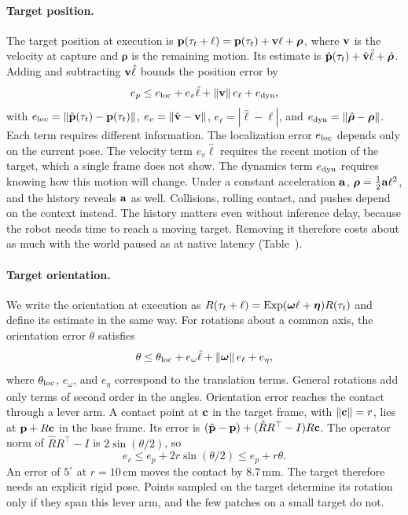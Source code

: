 \paragraph{Target position.}
The target position at execution is $\mathbf{p}(\tau_t+\ell)=\mathbf{p}(\tau_t)+\mathbf{v}\ell
+\boldsymbol\rho$, where $\mathbf{v}$ is the velocity at capture and $\boldsymbol\rho$ is
the remaining motion. Its estimate is $\hat{\mathbf{p}}(\tau_t)+\hat{\mathbf{v}}\hat\ell
+\hat{\boldsymbol\rho}$. Adding and subtracting $\mathbf{v}\hat\ell$ bounds the position
error by
\begin{equation}
e_p\le e_{\rm loc}+e_v\hat\ell+\|\mathbf{v}\|\,e_\ell+e_{\rm dyn},
\label{eq:budget_translation}
\end{equation}
with $e_{\rm loc}=\|\hat{\mathbf{p}}(\tau_t)-\mathbf{p}(\tau_t)\|$,
$e_v=\|\hat{\mathbf{v}}-\mathbf{v}\|$, $e_\ell=|\hat\ell-\ell|$, and
$e_{\rm dyn}=\|\hat{\boldsymbol\rho}-\boldsymbol\rho\|$. Each term requires different
information. The localization error $e_{\rm loc}$ depends only on the current pose. The
velocity term $e_v\hat\ell$ requires the recent motion of the target, which a single
frame does not show. The dynamics term $e_{\rm dyn}$ requires knowing how this motion
will change. Under a constant acceleration $\mathbf{a}$, $\boldsymbol\rho=\tfrac12\mathbf{a}
\ell^2$, and the history reveals $\mathbf{a}$ as well. Collisions, rolling contact, and
pushes depend on the context instead. The history matters
even without inference delay, because the robot needs time to reach a moving target.
Removing it therefore costs about as much with the world paused as at native latency (Table~).

\paragraph{Target orientation.}
We write the orientation at execution as $R(\tau_t+\ell)=\operatorname{Exp}(\boldsymbol\omega\ell+
\boldsymbol\eta)R(\tau_t)$ and define its estimate in the same way. For rotations about
a common axis, the orientation error $\theta$ satisfies
\begin{equation}
\theta\le\theta_{\rm loc}+e_\omega\hat\ell+\|\boldsymbol\omega\|\,e_\ell+e_\eta,
\label{eq:budget_rotation}
\end{equation}
where $\theta_{\rm loc}$, $e_\omega$, and $e_\eta$ correspond to the translation terms.
General rotations add only terms of second order in the angles. Orientation error
reaches the contact through a lever arm. A contact point at $\mathbf{c}$ in the target
frame, with $\|\mathbf{c}\|=r$, lies at $\mathbf{p}+R\mathbf{c}$ in the base frame. Its error is
$(\hat{\mathbf{p}}-\mathbf{p})+(\hat RR^\top-I)R\mathbf{c}$. The operator norm of
$\hat RR^\top-I$ is $2\sin(\theta/2)$, so
\begin{equation}
e_c\le e_p+2r\sin(\theta/2)\le e_p+r\theta .
\label{eq:budget_contact}
\end{equation}
An error of $5^\circ$ at $r=10$\,cm moves the contact by 8.7\,mm. The target therefore
needs an explicit rigid pose. Points sampled on the target determine its rotation only
if they span this lever arm, and the few patches on a small target do not.

